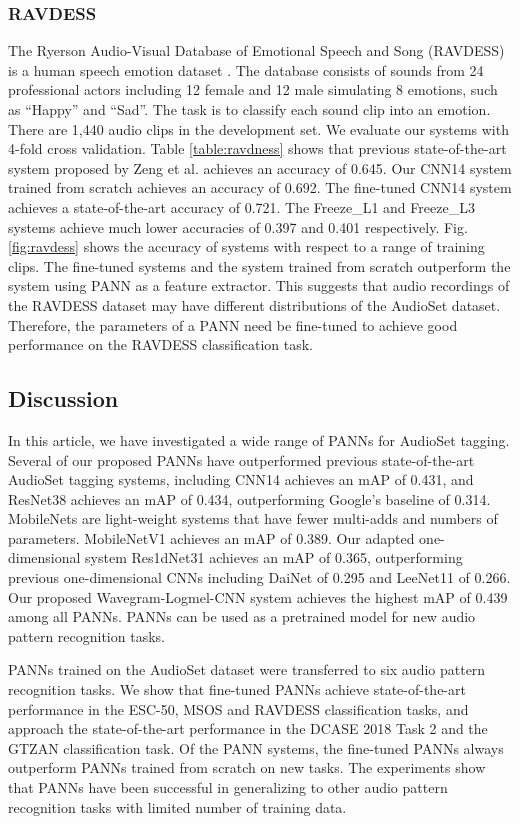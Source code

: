 \documentclass[journal]{IEEEtran}
\newcommand{\qk}[1] {{\color{black} #1}}
\begin{document}
\subsubsection{RAVDESS}
The Ryerson Audio-Visual Database of Emotional Speech and Song (RAVDESS) is a human speech emotion dataset \cite{livingstone2012ravdess}. The database consists of sounds from 24 professional actors including 12 female and 12 male simulating 8 emotions, such as ``Happy'' and ``Sad''. The task is to classify each sound clip into an emotion. There are 1,440 audio clips in the development set. We evaluate our systems with 4-fold cross validation. Table \ref{table:ravdness} shows that previous state-of-the-art system proposed by Zeng et al. \cite{zeng2019spectrogram} achieves an accuracy of 0.645. Our CNN14 system trained from scratch achieves an accuracy of 0.692. The fine-tuned CNN14 system achieves a state-of-the-art accuracy of 0.721. The Freeze\_L1 and Freeze\_L3 systems achieve much lower accuracies of 0.397 and 0.401 respectively. Fig. \ref{fig:ravdess} shows the accuracy of systems with respect to a range of training clips. The fine-tuned systems and the system trained from scratch outperform the system using PANN as a feature extractor. This suggests that audio recordings of the RAVDESS dataset may have different distributions of the AudioSet dataset. Therefore, the parameters of a PANN need be fine-tuned to achieve good performance on the RAVDESS classification task.

\subsection{Discussion}
In this article, we have investigated a wide range of PANNs for AudioSet tagging. Several of our proposed PANNs have outperformed previous state-of-the-art AudioSet tagging systems, including CNN14 achieves an mAP of 0.431, and ResNet38 achieves an mAP of 0.434, outperforming Google's baseline of 0.314. MobileNets are light-weight systems that have fewer multi-adds and numbers of parameters. MobileNetV1 achieves an mAP of 0.389. Our adapted one-dimensional system Res1dNet31 achieves an mAP of 0.365, outperforming previous one-dimensional CNNs including DaiNet \cite{dai2017very} of 0.295 and LeeNet11 \cite{lee2017sample} of 0.266. Our proposed Wavegram-Logmel-CNN system achieves the highest mAP of 0.439 among all PANNs. \qk{PANNs can be used as a pretrained model for new audio pattern recognition tasks.}

PANNs trained on the AudioSet dataset were transferred to six audio pattern recognition tasks. We show that fine-tuned PANNs achieve state-of-the-art performance in the ESC-50, MSOS and RAVDESS classification tasks, and approach the state-of-the-art performance in the DCASE 2018 Task 2 and the GTZAN classification task. Of the PANN systems, the fine-tuned PANNs always outperform PANNs trained from scratch on new tasks. The experiments show that PANNs have been successful in generalizing to other audio pattern recognition tasks with limited number of training data.
\end{document}
